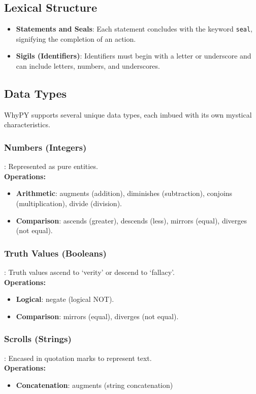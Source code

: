 \documentclass[conference]{IEEEtran}
\begin{document}
\subsection{Lexical Structure}
\begin{itemize}
    \item \textbf{Statements and Seals}: Each statement concludes with the keyword \texttt{seal}, signifying the completion of an action.
    \item \textbf{Sigils (Identifiers)}: Identifiers must begin with a letter or underscore and can include letters, numbers, and underscores.
\end{itemize}



\subsection{Data Types}
WhyPY supports several unique data types, each imbued with its own mystical characteristics.

\subsubsection{Numbers (Integers)}: Represented as pure entities. \\ 
\textbf{Operations:}
\begin{itemize}
    \item \textbf{Arithmetic}: augments (addition), diminishes (subtraction), conjoins (multiplication), divide (division).
    \item \textbf{Comparison}: ascends (greater), descends (less), mirrors (equal), diverges (not equal).
\end{itemize}

\subsubsection{Truth Values (Booleans)}: Truth values ascend to ‘verity’ or descend to ‘fallacy’. \\
\textbf{Operations:}
\begin{itemize}
    \item \textbf{Logical}: negate (logical NOT).
    \item \textbf{Comparison}: mirrors (equal), diverges (not equal).
\end{itemize}

\subsubsection{Scrolls (Strings)}: Encased in quotation marks to represent text. \\
\textbf{Operations:}
\begin{itemize}
    \item \textbf{Concatenation}: augments (string concatenation)
\end{itemize}
\end{document}
